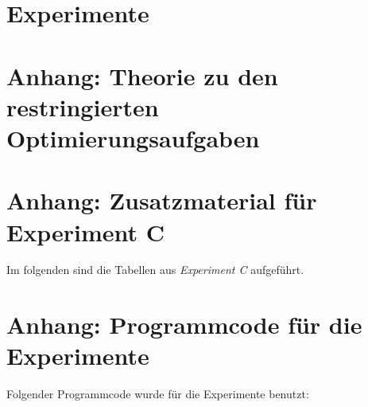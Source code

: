 \documentclass[bachelor,german]{mathe1thesis}
\begin{document}
\chapter{Experimente}

  
\chapter{Anhang: Theorie zu den restringierten Optimierungsaufgaben}


\chapter{Anhang: Zusatzmaterial für Experiment C}
\label{chap:zusatz-exp-c}
Im folgenden sind die Tabellen aus \emph{Experiment C} aufgeführt.


\chapter{Anhang: Programmcode für die Experimente}
Folgender Programmcode wurde für die Experimente benutzt:








\thesisbibliography



\appendix


\end{document}
